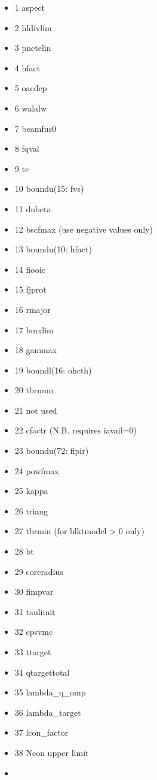 \documentclass[]{article}
\providecommand{\tightlist}{%
  \setlength{\itemsep}{0pt}\setlength{\parskip}{0pt}}
\begin{document}
\begin{itemize}
  \begin{itemize}
  \tightlist
  \item
    1 aspect
  \item
    2 hldivlim
  \item
    3 pnetelin
  \item
    4 hfact
  \item
    5 oacdcp
  \item
    6 walalw
  \item
    7 beamfus0
  \item
    8 fqval
  \item
    9 te
  \item
    10 boundu(15: fvs)
  \item
    11 dnbeta
  \item
    12 bscfmax (use negative values only)
  \item
    13 boundu(10: hfact)
  \item
    14 fiooic
  \item
    15 fjprot
  \item
    16 rmajor
  \item
    17 bmxlim
  \item
    18 gammax
  \item
    19 boundl(16: ohcth)
  \item
    20 tbrnmn
  \item
    21 not used
  \item
    22 cfactr (N.B. requires iavail=0)
  \item
    23 boundu(72: fipir)
  \item
    24 powfmax
  \item
    25 kappa
  \item
    26 triang
  \item
    27 tbrmin (for blktmodel \textgreater{} 0 only)
  \item
    28 bt
  \item
    29 coreradius
  \item
    30 fimpvar
  \item
    31 taulimit
  \item
    32 epsvmc
  \item
    33 ttarget
  \item
    34 qtargettotal
  \item
    35 lambda\_q\_omp
  \item
    36 lambda\_target
  \item
    37 lcon\_factor
  \item
    38 Neon upper limit
  \item

\end{itemize}
\end{itemize}
\end{document}
